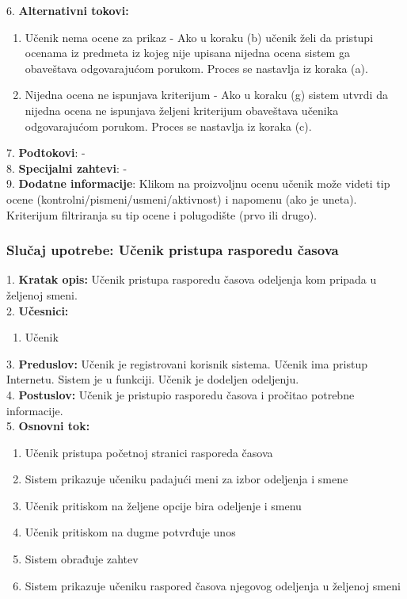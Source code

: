 \documentclass{article}
\begin{document}
6. \textbf{Alternativni tokovi:}
\begin{enumerate} [label=(\roman*)]
\item Učenik nema ocene za prikaz - Ako u koraku (b) učenik želi da pristupi ocenama iz predmeta iz kojeg nije upisana nijedna ocena sistem ga obaveštava odgovarajućom porukom. Proces se nastavlja iz koraka (a).
\item Nijedna ocena ne ispunjava kriterijum - Ako u koraku (g) sistem utvrdi da nijedna ocena ne ispunjava željeni kriterijum obaveštava učenika odgovarajućom porukom. Proces se nastavlja iz koraka (c).
\end{enumerate}

7. \textbf{Podtokovi}: - \\

8. \textbf{Specijalni zahtevi}: - \\

9. \textbf{Dodatne informacije}: Klikom na proizvoljnu ocenu učenik može videti tip ocene (kontrolni/pismeni/usmeni/aktivnost) i napomenu (ako je uneta). Kriterijum filtriranja su tip ocene i polugodište (prvo ili drugo). \\

\subsubsection{Slučaj upotrebe: Učenik pristupa rasporedu časova} 

1. \textbf{Kratak opis:} Učenik pristupa rasporedu časova odeljenja kom pripada u željenoj smeni. \\

2. \textbf{Učesnici:}
\begin{enumerate} [label=(\alph*)]
\item Učenik
\end{enumerate} 

3. \textbf{Preduslov:} Učenik je registrovani korisnik sistema. Učenik ima pristup Internetu. Sistem je u funkciji. Učenik je dodeljen odeljenju. \\

4. \textbf{Postuslov:} Učenik je pristupio rasporedu časova i pročitao potrebne informacije. \\

5. \textbf{Osnovni tok:} 
\begin{enumerate} [label=(\alph*)]
\item Učenik pristupa početnoj stranici rasporeda časova
\item Sistem prikazuje učeniku padajući meni za izbor odeljenja i smene
\item Učenik pritiskom na željene opcije bira odeljenje i smenu
\item Učenik pritiskom na dugme potvrđuje unos 
\item Sistem obrađuje zahtev
\item Sistem prikazuje učeniku raspored časova njegovog odeljenja u željenoj smeni 
\end{enumerate}
\end{document}
